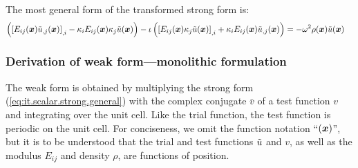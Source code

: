 %
The most general form of the transformed strong form is:
%
\begin{align}
    \left(
        \left[ E_{ij}(\boldsymbol{x}) \tilde{u}_{,j}(\boldsymbol{x}) \right]_{,i}
        - \kappa_{i} E_{ij}(\boldsymbol{x}) \kappa_{j} \tilde{u}(\boldsymbol{x})
    \right) - \iota \left(
        \left[
            E_{ij}(\boldsymbol{x}) \kappa_{j} \tilde{u}(\boldsymbol{x})
        \right]_{,i}
        + \kappa_{i} E_{ij}(\boldsymbol{x}) \tilde{u}_{,j}(\boldsymbol{x})
    \right) &=
    -\omega^2 \rho(\boldsymbol{x}) \tilde{u}(\boldsymbol{x}) \label{eq:it.scalar.strong.general}
\end{align}


\subsubsection{Derivation of weak form---monolithic formulation} \label{sec:it.scalar.weak-monolithic-derivation}

The weak form is obtained by multiplying the strong form (\ref{eq:it.scalar.strong.general}) with the complex conjugate \(\bar{v}\) of a test function \(v\) and integrating over the unit cell. Like the trial function, the test function is periodic on the unit cell. For conciseness, we omit the function notation ``\((\boldsymbol{x})\)'', but it is to be understood that the trial and test functions \(\tilde{u}\) and \(v\), as well as the modulus \(E_{ij}\) and density \(\rho\), are functions of position.


